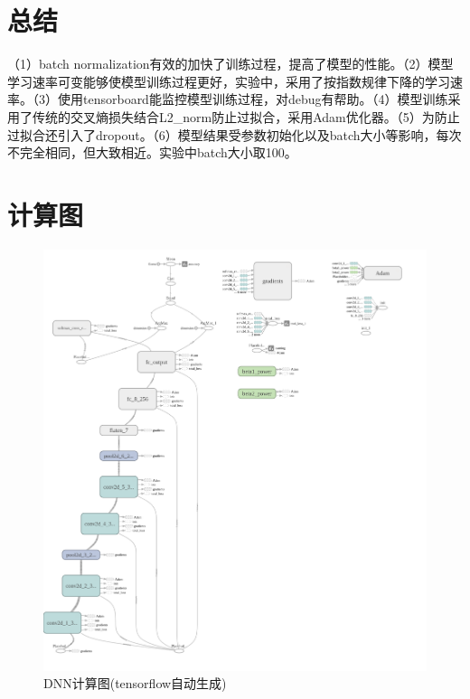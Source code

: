 \documentclass[a4paper]{article}
\begin{document}
    \section{总结}

    （1）batch normalization有效的加快了训练过程，提高了模型的性能。（2）模型学习速率可变能够使模型训练过程更好，实验中，采用了按指数规律下降的学习速率。（3）使用tensorboard能监控模型训练过程，对debug有帮助。（4）模型训练采用了传统的交叉熵损失结合L2\_norm防止过拟合，采用Adam优化器。（5）为防止过拟合还引入了dropout。（6）模型结果受参数初始化以及batch大小等影响，每次不完全相同，但大致相近。实验中batch大小取100。

    \section{计算图}

    \begin{figure}[htbp]
        \centering
        \includegraphics[width=\linewidth]{./images/graph_dnn.png}
        \caption{DNN计算图(tensorflow自动生成)}
        \label{fig:confusion_matrix}
    \end{figure}
    
\end{document}
